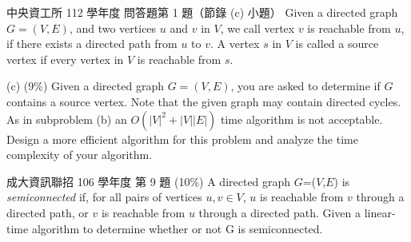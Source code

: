 \begin{pastexam}[label={px:con-2}]{中央資工所 112 學年度 問答題第 1 題（節錄 (c) 小題）}
Given a directed graph $G=(V,E)$, and two vertices $u$ and $v$ in $V$, we call vertex $v$ is reachable from $u$, if there exists a directed path from $u$ to $v$. A vertex $s$ in $V$ is called a source vertex if every vertex in $V$ is reachable from $s$.

(c) (9\%) Given a directed graph $G=(V,E)$, you are asked to determine if $G$ contains a source vertex. Note that the given graph may contain directed cycles. As in subproblem (b) an $O(|V|^2+|V||E|)$ time algorithm is not acceptable. Design a more efficient algorithm for this problem and analyze the time complexity of your algorithm.
\end{pastexam}

\begin{pastexam}[label={px:con-3}]{成大資訊聯招 106 學年度 第 9 題}
(10\%) A directed graph $G$=($V$,$E$) is \textit{semiconnected} if, for all pairs of vertices $u,v\in V$, $u$ is reachable from $v$ through a directed path, or $v$ is reachable from $u$ through a directed path. Given a linear-time algorithm to determine whether or not G is semiconnected.
\end{pastexam}

